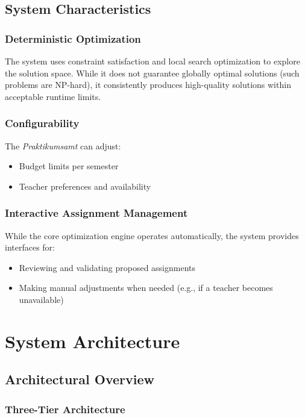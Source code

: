 \documentclass[12pt,a4paper]{report}
\begin{document}
\section{System Characteristics}

\subsection{Deterministic Optimization}

The system uses constraint satisfaction and local search optimization to explore the solution space. While it does not guarantee globally optimal solutions (such problems are NP-hard), it consistently produces high-quality solutions within acceptable runtime limits.

\subsection{Configurability}

The \textit{Praktikumsamt} can adjust:
\begin{itemize}
    \item Budget limits per semester
    \item Teacher preferences and availability
\end{itemize}

\subsection{Interactive Assignment Management}

While the core optimization engine operates automatically, the system provides interfaces for:
\begin{itemize}
    \item Reviewing and validating proposed assignments
    \item Making manual adjustments when needed (e.g., if a teacher becomes unavailable)
\end{itemize}


\chapter{System Architecture}

\section{Architectural Overview}

\subsection{Three-Tier Architecture}
\end{document}
